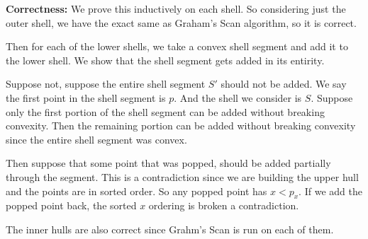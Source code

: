 \documentclass[11pt]{article}
\begin{document}
\textbf{Correctness:} We prove this inductively on each shell. So considering just the outer shell,
we have the exact same as Graham's Scan algorithm, so it is correct. 

Then for each of the lower shells, we take a convex shell segment and add it to the lower shell. 
We show that the shell segment gets added in its entirity.

Suppose not, suppose the entire shell segment $S'$ should not be added. We say the first point in the shell segment is $p$.
And the shell we consider is $S$. Suppose only the first portion of the shell segment can be added without breaking convexity.
Then the remaining portion can be added without breaking convexity since the entire shell segment was convex. 

Then suppose that some point that was popped, should be added partially through the segment. 
This is a contradiction since we are building the upper hull and the points are in sorted order. So any popped point has
$x < p_x$. If we add the popped point back, the sorted $x$ ordering is broken a contradiction.

The inner hulls are also correct since Grahm's Scan is run on each of them.  
\end{document}
